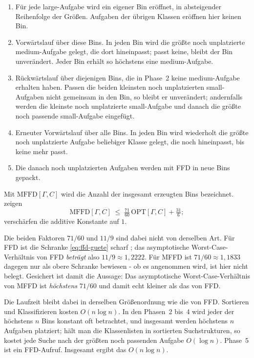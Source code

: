 \begin{enumerate}[label=\textit{Phase~\arabic*.}, leftmargin=*, itemsep=3pt]
  \item Für jede large-Aufgabe wird ein eigener Bin eröffnet, in absteigender Reihenfolge der
    Größen. Aufgaben der übrigen Klassen eröffnen hier keinen Bin.
  \item Vorwärtslauf über diese Bins. In jeden Bin wird die größte noch unplatzierte
    medium-Aufgabe gelegt, die dort hineinpasst; passt keine, bleibt der Bin unverändert.
    Jeder Bin erhält so höchstens eine medium-Aufgabe.
  \item Rückwärtslauf über diejenigen Bins, die in Phase~2 keine medium-Aufgabe erhalten haben.
    Passen die beiden kleinsten noch unplatzierten small-Aufgaben nicht gemeinsam in den Bin, so
    bleibt er unverändert; andernfalls werden die kleinste noch unplatzierte small-Aufgabe und
    danach die größte noch passende small-Aufgabe eingefügt.
  \item Erneuter Vorwärtslauf über alle Bins. In jeden Bin wird wiederholt die größte noch
    unplatzierte Aufgabe beliebiger Klasse gelegt, die noch hineinpasst, bis keine mehr passt.
  \item Die danach noch unplatzierten Aufgaben werden mit FFD in neue Bins gepackt.
\end{enumerate}

\noindent
Mit $\mathrm{MFFD}[\Gamma, C]$ wird die Anzahl der insgesamt erzeugten Bins bezeichnet.
\textcite{johnson_garey1985} zeigen
\begin{equation}
  \mathrm{MFFD}[\Gamma, C] \;\le\; \tfrac{71}{60}\,\mathrm{OPT}[\Gamma, C] + \tfrac{31}{6};
  \label{eq:mffd-guete}
\end{equation}
\textcite{yue_zhang1995} verschärfen die additive Konstante auf $1$.

Die beiden Faktoren $71/60$ und $11/9$ sind dabei nicht von derselben Art.
Für FFD ist die Schranke \eqref{eq:ffd-guete} scharf \cite{dosa2007}; das asymptotische
Worst-Case-Verhältnis von FFD \emph{beträgt} also $11/9 \approx 1{,}2222$.
Für MFFD ist $71/60 \approx 1{,}1833$ dagegen nur als obere Schranke bewiesen - ob es
angenommen wird, ist hier nicht belegt.
Gesichert ist damit die Aussage: Das asymptotische Worst-Case-Verhältnis von MFFD ist
\emph{höchstens} $71/60$ und damit echt kleiner als das von FFD.

Die Laufzeit bleibt dabei in derselben Größenordnung wie die von FFD.
Sortieren und Klassifizieren kosten $O(n \log n)$.
In den Phasen~2 bis~4 wird jeder der höchstens $n$ Bins konstant oft betrachtet, und insgesamt
werden höchstens $n$ Aufgaben platziert; hält man die Klassenlisten in sortierten Suchstrukturen,
so kostet jede Suche nach der größten noch passenden Aufgabe $O(\log n)$.
Phase~5 ist ein FFD-Aufruf.
Insgesamt ergibt das $O(n \log n)$.

